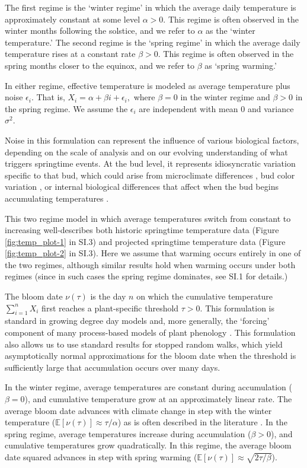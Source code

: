 \documentclass[
]{article}
\begin{document}
{The first regime is the `winter regime' in which the average daily temperature is approximately constant at some level $\alpha>0$. This regime is often observed in the winter months following the solstice, and we refer to $\alpha$ as the `winter temperature.'  The second regime is the `spring regime' in which the average daily temperature rises at a constant rate $\beta>0$. This regime is often observed in the spring months closer to the equinox, and we refer to $\beta$ as `spring warming.' 

In either regime, effective temperature is modeled as average temperature plus noise $\epsilon_i$. That is, $X_i = \alpha + \beta i + \epsilon_i,$ where $\beta=0$ in the winter regime and $\beta>0$ in the spring regime. We assume the $\epsilon_i$ are independent with mean $0$ and variance $\sigma^2$.

Noise in this formulation can represent the influence of various biological factors, depending on the scale of analysis and on our evolving understanding of what triggers springtime events. At the bud level, it represents idiosyncratic variation specific to that bud, which could arise from microclimate differences \citep{schwartz2014separating}, bud color variation \citep{peaucelle2022accurate}, or internal biological differences that affect when the bud begins accumulating temperatures \citep{vanderschoot2014,pan2023epigenetic}.

This two regime model in which average temperatures switch from constant to increasing well-describes both historic springtime temperature data (Figure \ref{fig:temp_plot-1} in SI.3) and projected springtime temperature data (Figure \ref{fig:temp_plot-2} in SI.3). Here we assume that warming occurs entirely in one of the two regimes, although similar results hold when warming occurs under both regimes (since in such cases the spring regime dominates, see SI.1 for details.)

The bloom date $\nu(\tau)$ is the day $n$ on which the cumulative temperature $\sum_{i=1}^n X_i$ first reaches a plant-specific threshold $\tau>0$. This formulation is standard in growing degree day models and, more generally, the `forcing' component of many process-based models of plant phenology \citep{schwartzbook}. This formulation also allows us to use standard results for stopped random walks, which yield asymptotically normal approximations for the bloom date when the threshold is sufficiently large that accumulation occurs over many days.

In the winter regime, average temperatures are constant during accumulation ($\beta = 0$), and cumulative temperature grow at an approximately linear rate. The average bloom date advances with climate change in step with the winter temperature ($\mathbb{E}[\nu(\tau)] \approx \tau / \alpha$) as is often described in the literature \citep{vitasse2022great}. In the spring regime, average temperatures increase during accumulation ($\beta > 0$), and cumulative temperatures grow quadratically. In this regime, the average bloom date squared advances in step with spring warming ($\mathbb{E}[\nu(\tau)] \approx \sqrt{ 2 \tau / \beta}$). 

}
\end{document}
